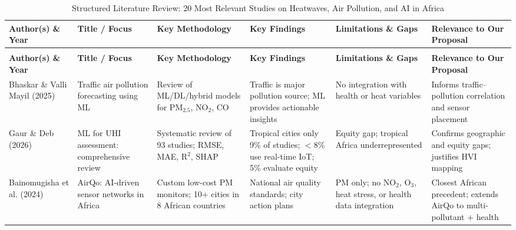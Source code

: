 \begin{landscape}
\small
\setlength{\LTcapwidth}{\linewidth}
\begin{longtable}{%
  >{\raggedright\arraybackslash}p{2.5cm}%
  >{\raggedright\arraybackslash}p{3.0cm}%
  >{\raggedright\arraybackslash}p{4.0cm}%
  >{\raggedright\arraybackslash}p{4.0cm}%
  >{\raggedright\arraybackslash}p{4.0cm}%
  >{\raggedright\arraybackslash}p{4.0cm}}

\caption{Structured Literature Review: 20 Most Relevant Studies on Heatwaves, Air Pollution, and AI in Africa}
\label{tab:litreview}\\

\toprule
\textbf{Author(s) \& Year} &
\textbf{Title / Focus} &
\textbf{Key Methodology} &
\textbf{Key Findings} &
\textbf{Limitations \& Gaps} &
\textbf{Relevance to Our Proposal}\\
\midrule
\endfirsthead

\multicolumn{6}{c}{\textit{\tablename\ \thetable{} -- continued}}\\[4pt]
\toprule
\textbf{Author(s) \& Year} &
\textbf{Title / Focus} &
\textbf{Key Methodology} &
\textbf{Key Findings} &
\textbf{Limitations \& Gaps} &
\textbf{Relevance to Our Proposal}\\
\midrule
\endhead

\bottomrule
\endlastfoot

Bhaskar \& Valli Mayil (2025)~\cite{bhaskar2025} &
Traffic air pollution forecasting using ML &
Review of ML/DL/hybrid models for PM$_{2.5}$, NO$_2$, CO &
Traffic is major pollution source; ML provides actionable insights &
No integration with health or heat variables &
Informs traffic--pollution correlation and sensor placement \\

Gaur \& Deb (2026)~\cite{gaur2026} &
ML for UHI assessment: comprehensive review &
Systematic review of 93 studies; RMSE, MAE, R$^2$, SHAP &
Tropical cities only 9\% of studies; $<$8\% use real-time IoT; 5\% evaluate equity &
Equity gap; tropical Africa underrepresented &
Confirms geographic and equity gaps; justifies HVI mapping \\

Bainomugisha et al. (2024)~\cite{bainomugisha2024} &
AirQo: AI-driven sensor networks in Africa &
Custom low-cost PM monitors; 10+ cities in 8 African countries &
National air quality standards; city action plans &
PM only; no NO$_2$, O$_3$, heat stress, or health data integration &
Closest African precedent; extends AirQo to multi-pollutant + health \\


\end{longtable}
\end{landscape}

